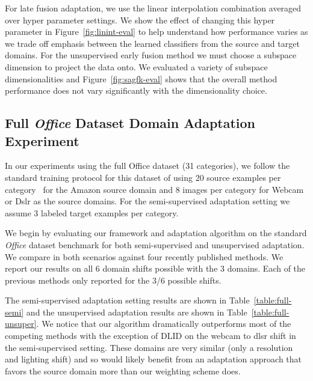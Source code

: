   For late fusion adaptation, we use the linear interpolation combination averaged over hyper parameter settings. We show the effect of changing this hyper parameter in Figure~\ref{fig:linint-eval} to help understand how performance varies as we trade off emphasis between the learned classifiers from the source and target domains. 
  For the unsupervised early fusion method we must choose a subspace dimension to project the data onto. We evaluated a variety of
  subspace dimensionalities and Figure~\ref{fig:sagfk-eval} shows that the overall method performance does not vary significantly with the dimensionality choice.

\subsection{Full \emph{Office} Dataset Domain Adaptation Experiment}
In our experiments using the full Office dataset (31 categories),
we follow the standard training protocol for this dataset of using 20 source
examples per category~\cite{saenko-eccv10,gong-cvpr12}
 for the Amazon source domain and 8 images per category for Webcam or
 Dslr as the source domains. For the semi-supervised adaptation setting 
 we assume 3 labeled target examples per category.


We begin by evaluating our framework and adaptation algorithm on the standard \emph{Office} dataset benchmark
for both semi-supervised and unsupervised adaptation. We compare in both scenarios against four recently published methods.
We report our results on all 6 domain shifts possible with the 3 domains. Each of the previous methods only reported for the 3/6 possible shifts. 

The semi-supervised adaptation setting results are shown in Table~\ref{table:full-semi} and the unsupervised adaptation results are shown in Table~\ref{table:full-unsuper}. We notice that our algorithm dramatically outperforms most of the competing methods with the exception of DLID on the webcam to dlsr shift in the semi-supervised setting. These domains are very similar (only a resolution and lighting shift) and so would likely benefit from an adaptation approach that favors the source domain more than our weighting scheme does. 

